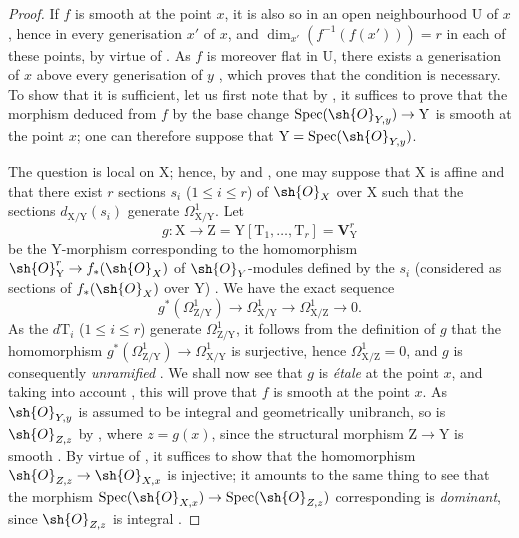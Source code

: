 \begin{proof}
If $f$ is smooth at the point $x$, it is also so in an open neighbourhood $\mathrm{U}$ of $x$, hence in every generisation $x'$ of $x$, and $\dim_{x'}(f^{-1}(f(x')))=r$ in each of these points, by virtue of .
As $f$ is moreover flat in $\mathrm{U}$, there exists a generisation of $x$ above every generisation of $y$ , which proves that the condition is necessary.
To show that it is sufficient, let us first note that by , it suffices to prove that the morphism deduced from $f$ by the base change $\operatorname{Spec}(\sh{O}_{Y,y})\to\mathrm{Y}$ is smooth at the point $x$; one can therefore suppose that $\mathrm{Y}=\operatorname{Spec}(\sh{O}_{Y,y})$.

The question is local on $\mathrm{X}$; hence, by  and , one may suppose that $\mathrm{X}$ is affine and that there exist $r$ sections $s_i$ ($1\leq i\leq r$) of $\sh{O}_X$ over $\mathrm{X}$ such that the sections $d_{\mathrm{X}/\mathrm{Y}}(s_i)$ generate $\Omega^1_{\mathrm{X}/\mathrm{Y}}$.
Let
\[
  g:\mathrm{X}\to\mathrm{Z}=\mathrm{Y}[\mathrm{T}_1,\ldots,\mathrm{T}_r]=\mathbf{V}_{\mathrm{Y}}^r
\]
be the $\mathrm{Y}$-morphism corresponding to the homomorphism $\sh{O}_{\mathrm{Y}}^r\to f_*(\sh{O}_X)$ of $\sh{O}_Y$-modules defined by the $s_i$ (considered as sections of $f_*(\sh{O}_X)$ over $\mathrm{Y}$) .
We have the exact sequence 
\[
  g^*(\Omega^1_{\mathrm{Z}/\mathrm{Y}})\to\Omega^1_{\mathrm{X}/\mathrm{Y}}\to\Omega^1_{\mathrm{X}/\mathrm{Z}}\to 0.
\]
As the $d\mathrm{T}_i$ ($1\leq i\leq r$) generate $\Omega^1_{\mathrm{Z}/\mathrm{Y}}$, it follows from the definition of $g$ that the homomorphism $g^*(\Omega^1_{\mathrm{Z}/\mathrm{Y}})\to\Omega^1_{\mathrm{X}/\mathrm{Y}}$ is surjective, hence $\Omega^1_{\mathrm{X}/\mathrm{Z}}=0$, and $g$ is consequently \emph{unramified} .
We shall now see that $g$ is \emph{\'etale} at the point $x$, and taking into account , this will prove that $f$ is smooth at the point $x$.
As $\sh{O}_{Y,y}$ is assumed to be integral and geometrically
unibranch, so is $\sh{O}_{Z,z}$ by , where $z=g(x)$, since the structural morphism $\mathrm{Z}\to\mathrm{Y}$ is smooth .
By virtue of , it suffices to show that the homomorphism $\sh{O}_{Z,z}\to\sh{O}_{X,x}$ is injective; it amounts to the same thing to see that the morphism $\operatorname{Spec}(\sh{O}_{X,x})\to\operatorname{Spec}(\sh{O}_{Z,z})$ corresponding is \emph{dominant}, since $\sh{O}_{Z,z}$ is integral .

\end{proof}
